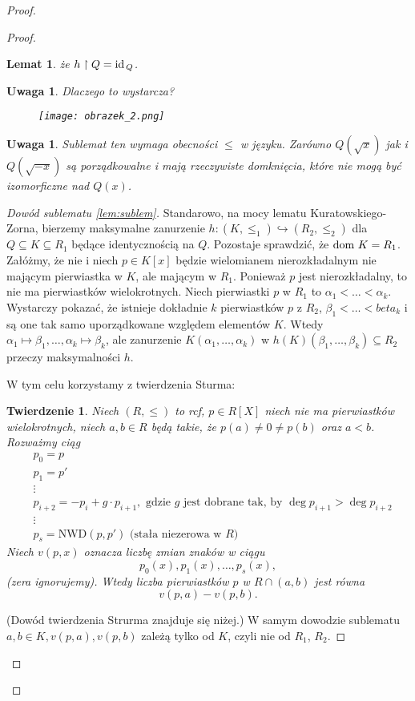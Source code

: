\documentclass{article}
\newcommand{\id}{\textnormal{id}}
\newcommand{\dom}{\textnormal{dom }}
\theoremstyle{plain}
\newtheorem{tw}[thm]{Twierdzenie}
\newtheorem{lem}[thm]{Lemat}
\newtheorem{uw}[thm]{Uwaga}
\theoremstyle{definition}
\theoremstyle{remark}
\begin{document}
\begin{proof}
\begin{proof}
\begin{lem}
			że $h\restriction{Q} = \id_{\,Q}$.
		\end{lem}
		\begin{uw}
			Dlaczego to wystarcza?
			\begin{figure}[!h]
				\centering
				\texttt{[image: obrazek\_2.png]}
			\end{figure}
		\end{uw}
		\begin{uw}
			Sublemat ten wymaga obecności $\leq$ w języku.
			Zarówno $Q(\sqrt{x})$ jak i $Q(\sqrt{-x})$ są
			porządkowalne i mają rzeczywiste domknięcia, które
			nie mogą być izomorficzne nad $Q(x)$.
		\end{uw}
		\begin{proof}[Dowód sublematu \ref{lem:sublem}]
			Standarowo, na mocy lematu Kuratowskiego-Zorna,
			bierzemy maksymalne zanurzenie
			$h \colon (K, \leq_1) \hookrightarrow (R_2, \leq_2)$
			dla $Q \subseteq K \subseteq R_1$ będące identycznością
			na $Q$. Pozostaje sprawdzić, że $\dom K = R_1$. Załóżmy,
			że nie i niech $p \in K[x]$ będzie wielomianem
			nierozkładalnym nie mającym pierwiastka w $K$, ale
			mającym w $R_1$. Ponieważ $p$ jest nierozkładalny, to
			nie ma pierwiastków wielokrotnych. Niech pierwiastki $p$
			w $R_1$ to $\alpha_1 < \ldots < \alpha_k$. Wystarczy
			pokazać, że istnieje dokładnie $k$ pierwiastków $p$
			z $R_2$, $\beta_1 < \ldots < beta_k$ i są one tak samo
			uporządkowane względem elementów $K$. Wtedy
			$\alpha_1 \mapsto \beta_1, \ldots,
			\alpha_k \mapsto \beta_k$, ale zanurzenie
			$K(\alpha_1, \ldots, \alpha_k)$ w
			$h(K)(\beta_1, \ldots, \beta_k) \subseteq R_2$
			przeczy maksymalności $h$.

		W tym celu korzystamy z twierdzenia Sturma:
		\begin{tw} \label{tw:sturma}
			Niech $(R, \leq)$ to rcf, $p \in R[X]$ niech nie ma
			pierwiastków wielokrotnych, niech $a, b \in R$ będą
			takie, że $p(a) \neq 0 \neq p(b)$ oraz $a < b$.
			Rozważmy ciąg
			\begin{align*}
				&p_0 = p \\
				&p_1 = p' \\
				&\vdots \\
				&p_{i+2} = -p_i + g \cdot p_{i + 1},
				\text{ gdzie } g \text{ jest dobrane tak, by }
				\deg p_{i+1} > \deg p_{i+2} \\
				&\vdots \\
				&p_s = \text{NWD}(p, p')
				\text{ (stała niezerowa w } R\text{)}
			\end{align*}
			Niech $v(p, x)$ oznacza liczbę zmian znaków w ciągu
			$$p_0(x), p_1(x), \ldots, p_s(x),$$
			(zera ignorujemy). Wtedy liczba pierwiastków $p$
			w $R \cap (a, b)$ jest równa $$v(p, a) - v(p, b).$$
		\end{tw}
		(Dowód twierdzenia Strurma znajduje się niżej.)
			W samym dowodzie sublematu $a, b \in K, v(p, a), v(p, b)$
			zależą tylko od $K$, czyli nie od $R_1$, $R_2$.


\end{proof}
\end{proof}
\end{proof}
\end{document}
